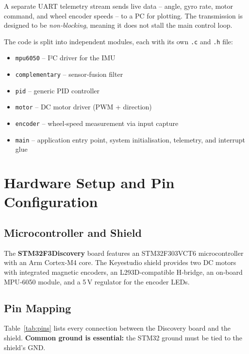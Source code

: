 \documentclass[12pt,a4paper]{article}
\begin{document}
	A separate UART telemetry stream sends live data -- angle, gyro rate, motor command, and wheel encoder speeds -- to a PC for plotting.  
	The transmission is designed to be \textit{non‑blocking}, meaning it does not stall the main control loop.
	
	The code is split into independent modules, each with its own \texttt{.c} and \texttt{.h} file:
	\begin{itemize}
		\item \texttt{mpu6050} -- I²C driver for the IMU
		\item \texttt{complementary} -- sensor‑fusion filter
		\item \texttt{pid} -- generic PID controller
		\item \texttt{motor} -- DC motor driver (PWM + direction)
		\item \texttt{encoder} -- wheel‑speed measurement via input capture
		\item \texttt{main} -- application entry point, system initialisation, telemetry, and interrupt glue
	\end{itemize}
	
	\section{Hardware Setup and Pin Configuration}
	\label{sec:hardware}
	
	\subsection{Microcontroller and Shield}
	The \textbf{STM32F3Discovery} board features an STM32F303VCT6 microcontroller with an Arm Cortex‑M4 core.  
	The Keyestudio shield provides two DC motors with integrated magnetic encoders, an L293D‑compatible H‑bridge, an on‑board MPU‑6050 module, and a 5\,V regulator for the encoder LEDs.
	
	\subsection{Pin Mapping}
	Table~\ref{tab:pins} lists every connection between the Discovery board and the shield.  
	\textbf{Common ground is essential:} the STM32 ground must be tied to the shield’s GND.
	
\end{document}
